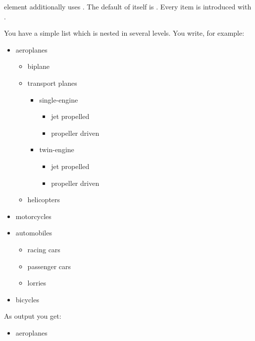   element  additionally uses . The
  default of  itself is .  Every
  item is introduced with .%
    \begin{Example}
      You have a simple list which is nested in several levels. You write,
      for example:
\begin{lstcode}
  \begin{itemize}
    \item aeroplanes
    \begin{itemize}
      \item biplane
      \item transport planes
      \begin{itemize}
        \item single-engine
        \begin{itemize}
          \item jet propelled
          \item propeller driven
        \end{itemize}
        \item twin-engine
        \begin{itemize}
	      \item jet propelled
		  \item propeller driven
		\end{itemize}
      \end{itemize}
      \item helicopters
    \end{itemize}
    \item motorcycles
    \item automobiles
    \begin{itemize}
      \item racing cars
      \item passenger cars
      \item lorries
    \end{itemize}
    \item bicycles
  \end{itemize}
\end{lstcode}
      As output you get:
      \begin{ShowOutput}[\baselineskip]
        \begin{itemize}
        \item aeroplanes

\end{itemize}
\end{ShowOutput}
\end{Example}
